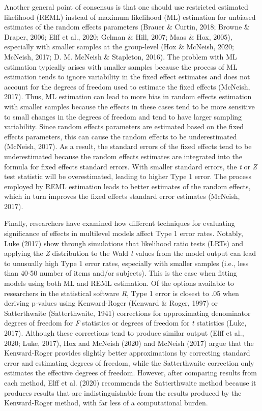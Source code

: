 \documentclass[
  english,
  man, noextraspace,floatsintext]{apa6}
\begin{document}
Another general point of consensus is that one should use restricted estimated likelihood (REML) instead of maximum likelihood (ML) estimation for unbiased estimates of the random effects parameters (Brauer \& Curtin, 2018; Browne \& Draper, 2006; Elff et al., 2020; Gelman \& Hill, 2007; Maas \& Hox, 2005), especially with smaller samples at the group-level (Hox \& McNeish, 2020; McNeish, 2017; D. M. McNeish \& Stapleton, 2016). The problem with ML estimation typically arises with smaller samples because the process of ML estimation tends to ignore variability in the fixed effect estimates and does not account for the degrees of freedom used to estimate the fixed effects (McNeish, 2017). Thus, ML estimation can lead to more bias in random effects estimation with smaller samples because the effects in these cases tend to be more sensitive to small changes in the degrees of freedom and tend to have larger sampling variability. Since random effects parameters are estimated based on the fixed effects parameters, this can cause the random effects to be underestimated (McNeish, 2017). As a result, the standard errors of the fixed effects tend to be underestimated because the random effects estimates are integrated into the formula for fixed effects standard errors. With smaller standard errors, the \emph{t} or \emph{Z} test statistic will be overestimated, leading to higher Type 1 error. The process employed by REML estimation leads to better estimates of the random effects, which in turn improves the fixed effects standard error estimates (McNeish, 2017).

Finally, researchers have examined how different techniques for evaluating significance of effects in multilevel models affect Type 1 error rates. Notably, Luke (2017) show through simulations that likelihood ratio tests (LRTs) and applying the \emph{Z} distribution to the Wald \emph{t} values from the model output can lead to unusually high Type 1 error rates, especially with smaller samples (i.e., less than 40-50 number of items and/or subjects). This is the case when fitting models using both ML and REML estimation. Of the options available to researchers in the statistical software \emph{R}, Type 1 error is closest to .05 when deriving p-values using Kenward-Roger (Kenward \& Roger, 1997) or Satterthwaite (Satterthwaite, 1941) corrections for approximating denominator degrees of freedom for \emph{F} statistics or degrees of freedom for \emph{t} statistics (Luke, 2017). Although these corrections tend to produce similar output (Elff et al., 2020; Luke, 2017), Hox and McNeish (2020) and McNeish (2017) argue that the Kenward-Roger provides slightly better approximations by correcting standard error and estimating degrees of freedom, while the Satterthwaite correction only estimates the effective degrees of freedom. However, after comparing results from each method, Elff et al. (2020) recommends the Satterthwaite method because it produces results that are indistinguishable from the results produced by the Kenward-Roger method, with far less of a computational burden.
\end{document}
